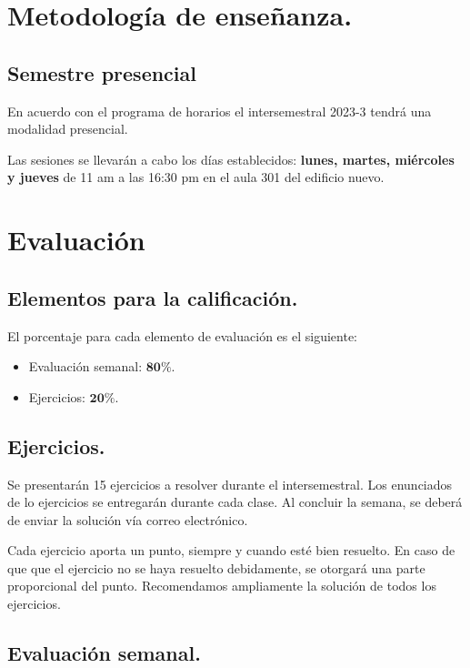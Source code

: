 \section{Metodología de enseñanza.}

\subsection{Semestre presencial}

En acuerdo con el programa de horarios el intersemestral 2023-3 tendrá una modalidad presencial.
\par
Las sesiones se llevarán a cabo los días establecidos: \textbf{lunes, martes, miércoles y jueves} de 11 am a las 16:30 pm en el aula 301 del edificio nuevo.

\section{Evaluación}

\subsection{Elementos para la calificación.}

El porcentaje para cada elemento de evaluación es el siguiente:
\begin{itemize}
\setlength{\itemsep}{0mm}
\item Evaluación semanal: $\mathbf{80\%}$.
\item Ejercicios: $\mathbf{20\%}$.
\end{itemize}

\subsection{Ejercicios.}

Se presentarán 15 ejercicios a resolver durante el intersemestral. Los enunciados de lo ejercicios se entregarán durante cada clase.  Al concluir la semana, se deberá de enviar la solución vía correo electrónico.
\par
Cada ejercicio aporta un punto, siempre y cuando esté bien resuelto. En caso de que que el ejercicio no se haya resuelto debidamente, se otorgará una parte proporcional del punto. Recomendamos ampliamente la solución de todos los ejercicios.

\subsection{Evaluación semanal.}

